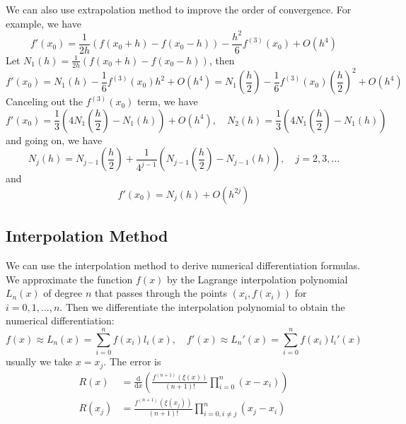 \documentclass{matharticle}
\begin{document}
\begin{remark}
	We can also use extrapolation method to improve the order of convergence. For example, we have
	\begin{equation*}
		f'(x_0) = \frac{1}{2h} (f(x_0 + h) - f(x_0 - h)) - \frac{h^2}{6} f^{(3)}(x_0) + O(h^4)
	\end{equation*}
	Let $N_1(h) = \frac{1}{2h} (f(x_0 + h) - f(x_0 - h))$, then
	\begin{equation*}
		f'(x_0) = N_1(h) - \frac{1}{6}f^{(3)}(x_0) h^2 + O(h^4) = N_1(\frac{h}{2}) - \frac{1}{6}f^{(3)}(x_0) (\frac{h}{2})^2 + O(h^4)
	\end{equation*}
	Canceling out the $f^{(3)}(x_0)$ term, we have
	\begin{equation}
		f'(x_0) = \frac{1}{3} \left(4 N_1(\frac{h}{2}) - N_1(h) \right) + O(h^4), \quad N_2(h) = \frac{1}{3} \left(4 N_1(\frac{h}{2}) - N_1(h) \right)
	\end{equation}
	and going on, we have
	\begin{equation}
		N_j(h) = N_{j-1}(\frac{h}{2}) + \frac{1}{4^{j-1}} \left( N_{j-1}(\frac{h}{2}) - N_{j-1}(h) \right), \quad j = 2, 3, \ldots
	\end{equation}
	and
	\begin{equation}
		f'(x_0) = N_j(h) + O(h^{2j})
	\end{equation}
\end{remark}

\subsection{Interpolation Method}
We can use the interpolation method to derive numerical differentiation formulas. We approximate the function $f(x)$ by the Lagrange interpolation polynomial $L_n(x)$ of degree $n$ that passes through the points $(x_i, f(x_i))$ for $i = 0, 1, \ldots, n$. Then we differentiate the interpolation polynomial to obtain the numerical differentiation:
\begin{equation}
	f(x) \approx L_n(x) = \sum_{i=0}^{n} f(x_i) l_i(x), \quad f'(x) \approx L_n'(x) = \sum_{i=0}^{n} f(x_i) l_i'(x)
\end{equation}
usually we take $x = x_j$. The error is
\begin{equation}
	\begin{aligned}
		R(x)   & = \frac{\mathrm{d} }{\mathrm{d} x} \left( \frac{f^{(n+1)}(\xi(x))}{(n+1)!} \prod_{i=0}^{n} (x - x_i) \right) \\
		R(x_j) & = \frac{f^{(n+1)}(\xi(x_j))}{(n+1)!} \prod_{i=0, i \neq j}^{n} (x_j - x_i)
	\end{aligned}
\end{equation}
\end{document}
